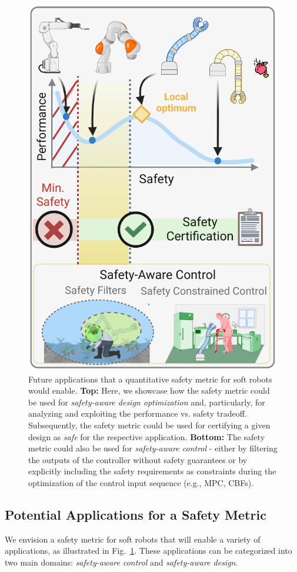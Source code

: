 \begin{figure}
    \centering
    \includegraphics[width=0.65\linewidth]{safetymetric/figures/safety_metric_applications.pdf}
    \caption{Future applications that a quantitative safety metric for soft robots would enable. \textbf{Top:} Here, we showcase how the safety metric could be used for \emph{safety-aware design optimization} and, particularly, for analyzing and exploiting the performance vs. safety tradeoff. Subsequently, the safety metric could be used for certifying a given design as \emph{safe} for the respective application. \textbf{Bottom:} The safety metric could also be used for \emph{safety-aware control} - either by filtering the outputs of the controller without safety guarantees or by explicitly including the safety requirements as constraints during the optimization of the control input sequence (e.g., \gls{MPC}, \glspl{CBF}).}
    \label{fig:safetymetric:safety_metric_applications}
\end{figure}

\subsection{Potential Applications for a Safety Metric}\label{sub:safetymetric:safety_metric_applications}
We envision a safety metric for soft robots that will enable a variety of applications, as illustrated in Fig.~\ref{fig:safetymetric:safety_metric_applications}. These applications can be categorized into two main domains: \emph{safety-aware control} and \emph{safety-aware design}.

